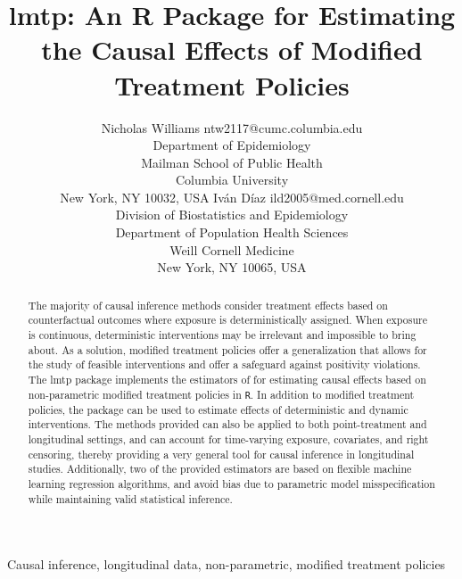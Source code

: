\documentclass[twoside,11pt]{article}
\newcommand{\pkg}[1]{{\fontseries{b}\selectfont #1}}
\begin{document}
\title{lmtp: An R Package for Estimating the Causal Effects of Modified Treatment Policies}

\author{\name Nicholas Williams \email ntw2117@cumc.columbia.edu \\
       \addr Department of Epidemiology \\
       Mailman School of Public Health \\
       Columbia University \\
       New York, NY 10032, USA
       \AND
       \name Iván Díaz \email ild2005@med.cornell.edu \\
       \addr Division of Biostatistics and Epidemiology \\
       Department of Population Health Sciences \\
       Weill Cornell Medicine \\
       New York, NY 10065, USA}

\maketitle

\begin{abstract}%
The majority of causal inference methods consider treatment effects based on counterfactual outcomes where exposure is deterministically assigned. When exposure is continuous, deterministic interventions may be irrelevant and impossible to bring about. As a solution, modified treatment policies offer a generalization that allows for the study of feasible interventions and offer a safeguard against positivity violations. The \pkg{lmtp} package implements the estimators of \citet{jasaLMTP} for estimating causal effects based on non-parametric modified treatment policies in \texttt{R}. In addition to modified treatment policies, the package can be used to estimate effects of deterministic and dynamic interventions. The methods provided can also be applied to both point-treatment and longitudinal settings, and can account for time-varying exposure, covariates, and right censoring, thereby providing a very general tool for causal inference in longitudinal studies. Additionally, two of the provided estimators are based on flexible machine learning regression algorithms, and avoid bias due to parametric model misspecification while maintaining valid statistical inference.
\end{abstract}

\begin{keywords}
Causal inference, longitudinal data, non-parametric, modified treatment policies
\end{keywords}
\end{document}
